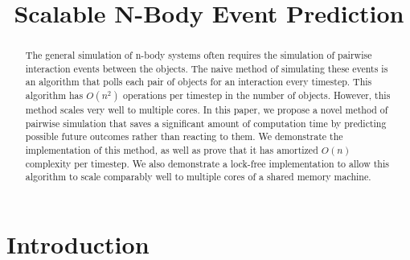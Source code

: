 \documentclass[conference]{IEEEtran}
\begin{document}
%
\title{Scalable N-Body Event Prediction}


\author{
\and{}
}

\maketitle


\begin{abstract} %
The general simulation of n-body systems often requires the simulation of pairwise interaction events between the objects.  The naive method of simulating these events is an algorithm that polls each pair of objects for an interaction every timestep.  This algorithm has $O(n^2)$ operations per timestep in the number of objects.  However, this method scales very well to multiple cores. In this paper, we propose a novel method of pairwise simulation that saves a significant amount of computation time by predicting possible future outcomes rather than reacting to them.  We demonstrate the implementation of this method, as well as prove that it has amortized $O(n)$ complexity per timestep.  We also demonstrate a lock-free implementation to allow this algorithm to scale comparably well to multiple cores of a shared memory machine.
\end{abstract}

\IEEEpeerreviewmaketitle


\section{Introduction}
\end{document}
